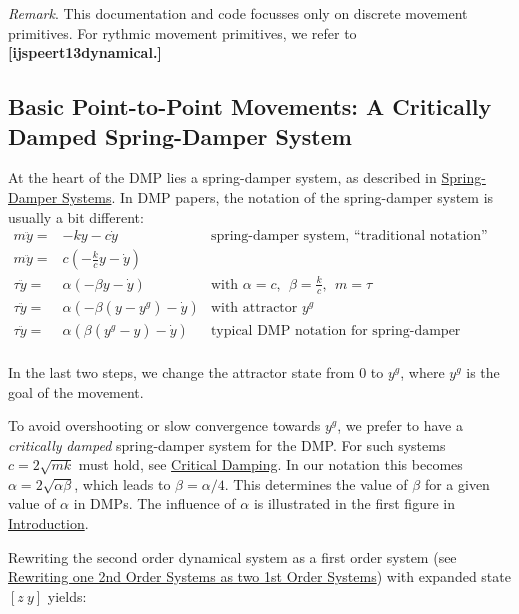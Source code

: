 {\itshape Remark}. This documentation and code focusses only on discrete movement primitives. For rythmic movement primitives, we refer to {\bfseries [ijspeert13dynamical.]}\hypertarget{page_dmp_sec_core}{}\subsection{Basic Point-\/to-\/\+Point Movements\+: A Critically Damped Spring-\/\+Damper System}\label{page_dmp_sec_core}
At the heart of the D\+M\+P lies a spring-\/damper system, as described in \hyperlink{page_dyn_sys_dyn_sys_spring_damper}{Spring-\/\+Damper Systems}. In D\+M\+P papers, the notation of the spring-\/damper system is usually a bit different\+: \begin{eqnarray*} m\ddot{y} =& -ky -c\dot{y} & \mbox{spring-damper system, ``traditional notation''} \\ m\ddot{y} =& c(-\frac{k}{c}y - \dot{y})\\ \tau\ddot{y} =& \alpha(-\beta y - \dot{y}) & \mbox{with } \alpha=c,~~\beta = \frac{k}{c},~~m=\tau\\ \tau\ddot{y} =& \alpha(-\beta (y-y^g) - \dot{y})& \mbox{with attractor } y^g\\ \tau\ddot{y} =& \alpha(\beta (y^g-y) - \dot{y})& \mbox{typical DMP notation for spring-damper system}\\ \end{eqnarray*}

In the last two steps, we change the attractor state from 0 to $y^g$, where $y^g$ is the goal of the movement.

To avoid overshooting or slow convergence towards $y^g$, we prefer to have a {\itshape critically} {\itshape damped} spring-\/damper system for the D\+M\+P. For such systems $c = 2\sqrt{mk}$ must hold, see \hyperlink{page_dyn_sys_dyn_sys_critical_damping}{Critical Damping}. In our notation this becomes $\alpha = 2\sqrt{\alpha\beta}$, which leads to $\beta = \alpha/4$. This determines the value of $\beta$ for a given value of $\alpha$ in D\+M\+Ps. The influence of $\alpha$ is illustrated in the first figure in \hyperlink{page_dyn_sys_sec_dyn_sys_intro}{Introduction}.

Rewriting the second order dynamical system as a first order system (see \hyperlink{page_dyn_sys_dyn_sys_rewrite_second_first}{Rewriting one 2nd Order Systems as two 1st Order Systems}) with expanded state $ [z~y]$ yields\+:

